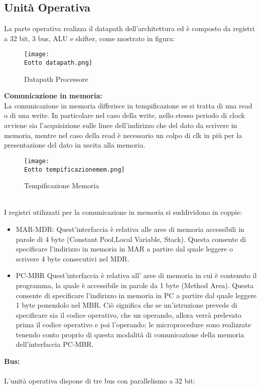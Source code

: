 \documentclass[12pt]{article}
\def \Eotto {Allegati/Esercizio8/}
\begin{document}
\subsection{Unità Operativa}
La parte operativa realizza il datapath dell’architettura ed è composto da registri a 32 bit, 3 bus, ALU e shifter, come mostrato in figura:
\begin{figure}[ht!]
    \centering
    \texttt{[image: \\Eotto datapath.png]}
    \caption{Datapath Processore}
\end{figure}
\clearpage
{\large \textbf{Comunicazione in memoria:}}
\\La comunicazione in memoria differisce in tempificazione se si tratta di una read o di una write. In particolare nel caso della write, nello stesso periodo di clock avviene sia l’acquisizione sulle linee dell’indirizzo che del dato da scrivere in memoria, mentre nel caso della read è necessario un colpo di clk in più per la presentazione del dato in uscita alla memoria.
\begin{figure}[ht!]
    \centering
    \texttt{[image: \\Eotto tempificazionemem.png]}
    \caption{Tempificazione Memoria}
\end{figure}
\\I registri utilizzati per la comunicazione in memoria si suddividono in coppie:
\begin{itemize}
    \item MAR-MDR: Quest’interfaccia è relativa alle aree di memoria accessibili in parole di 4 byte (Constant Pool,Local Variable, Stack). Questa consente di specificare l’indirizzo in memoria in MAR a partire dal quale leggere o scrivere 4 byte consecutivi nel MDR.
    \item PC-MBR  Quest’interfaccia è relativa all’ aree di memoria in cui è contenuto il programma, la quale è accessibile in parole da 1 byte (Method Area). Questa consente di specificare l’indirizzo in memoria in PC a partire dal quale leggere 1 byte ponendolo nel MBR. Ciò significa che se un’istruzione prevede di specificare sia il codice operativo, che un operando, allora verrà prelevato prima il codice operativo e poi l’operando; le microprocedure sono realizzate tenendo conto proprio di questa modalità di comunicazione della memoria dell’interfaccia PC-MBR.
\end{itemize}
\clearpage
{\large \textbf{Bus:}}
\\\\L’unità operativa dispone di tre bus con parallelismo a 32 bit:
\end{document}
